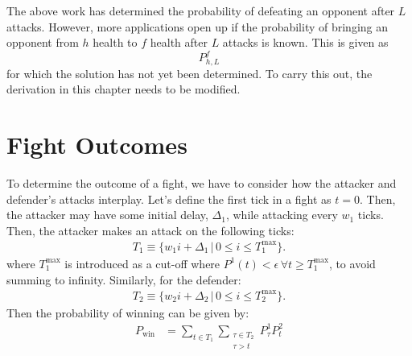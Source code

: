 			The above work has determined the probability of defeating an opponent after $L$ attacks. However, more applications open up if the probability of bringing an opponent from $h$ health to $f$ health after $L$ attacks is known. This is given as
			\begin{equation}
				P^f_{h, L}
			\end{equation}
			for which the solution has not yet been determined. To carry this out, the derivation in this chapter needs to be modified.

		\section{Fight Outcomes}

			To determine the outcome of a fight, we have to consider how the attacker and defender's attacks interplay. Let's define the first tick in a fight as $t=0$. Then, the attacker may have some initial delay, $\Delta_1$, while attacking every $w_1$ ticks. Then, the attacker makes an attack on the following ticks:
			\begin{align}
				T_1 \equiv \{w_1i + \Delta_1 \,|\, 0 \le i \le T_1^\text{max}\}.
			\end{align}
			where $T_1^\text{max}$ is introduced as a cut-off where $P^1(t) < \epsilon\,\forall t \ge T_1^\text{max}$, to avoid summing to infinity. Similarly, for the defender:
			\begin{align}
				T_2 \equiv \{w_2i + \Delta_2 \,|\, 0 \le i \le T_2^\text{max}\}.
			\end{align}
			Then the probability of winning can be given by:
			\begin{align}
				P_\text{win} &= \sum_{t \in T_1} \sum_{\substack{\tau \in T_2 \\ \tau > t}} P_{\tau}^{1} P_{t}^{2} \\
			\end{align}

